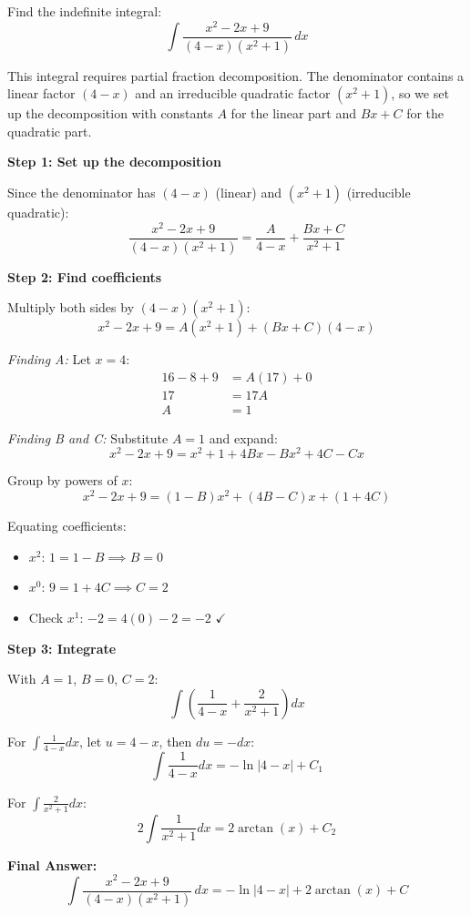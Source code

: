 
\begin{problem}
Find the indefinite integral:
\[
\int \frac{x^2 - 2x + 9}{(4-x)(x^2+1)} \, dx
\]
\end{problem}

\begin{hint}
This integral requires partial fraction decomposition. The denominator contains a linear factor $(4-x)$ and an irreducible quadratic factor $(x^2+1)$, so we set up the decomposition with constants $A$ for the linear part and $Bx+C$ for the quadratic part.
\end{hint}

\begin{solution}
\textbf{Step 1: Set up the decomposition}

Since the denominator has $(4-x)$ (linear) and $(x^2+1)$ (irreducible quadratic):
\[
\frac{x^2 - 2x + 9}{(4-x)(x^2+1)} = \frac{A}{4-x} + \frac{Bx + C}{x^2 + 1}
\]

\textbf{Step 2: Find coefficients}

Multiply both sides by $(4-x)(x^2+1)$:
\[
x^2 - 2x + 9 = A(x^2 + 1) + (Bx + C)(4 - x)
\]

\textit{Finding A:} Let $x = 4$:
\begin{align*}
16 - 8 + 9 &= A(17) + 0 \\
17 &= 17A \\
A &= 1
\end{align*}

\textit{Finding B and C:} Substitute $A = 1$ and expand:
\[
x^2 - 2x + 9 = x^2 + 1 + 4Bx - Bx^2 + 4C - Cx
\]

Group by powers of $x$:
\[
x^2 - 2x + 9 = (1 - B)x^2 + (4B - C)x + (1 + 4C)
\]

Equating coefficients:
\begin{itemize}
\item $x^2$: $1 = 1 - B \implies B = 0$
\item $x^0$: $9 = 1 + 4C \implies C = 2$
\item Check $x^1$: $-2 = 4(0) - 2 = -2$ $\checkmark$
\end{itemize}

\textbf{Step 3: Integrate}

With $A=1$, $B=0$, $C=2$:
\[
\int \left( \frac{1}{4-x} + \frac{2}{x^2+1} \right) dx
\]

For $\int \frac{1}{4-x} dx$, let $u = 4-x$, then $du = -dx$:
\[
\int \frac{1}{4-x} dx = -\ln|4-x| + C_1
\]

For $\int \frac{2}{x^2+1} dx$:
\[
2 \int \frac{1}{x^2+1} dx = 2\arctan(x) + C_2
\]

\textbf{Final Answer:}
\[
\boxed{\int \frac{x^2 - 2x + 9}{(4-x)(x^2+1)} \, dx = -\ln|4-x| + 2\arctan(x) + C}
\]
\end{solution}

